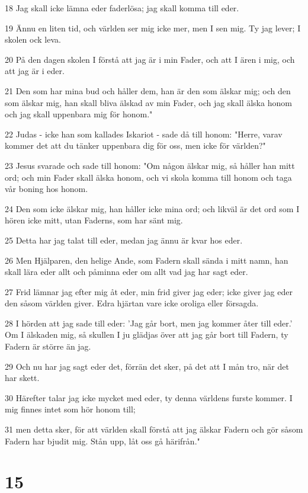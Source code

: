 \par 18 Jag skall icke lämna eder faderlösa; jag skall komma till eder.
\par 19 Ännu en liten tid, och världen ser mig icke mer, men I sen mig. Ty jag lever; I skolen ock leva.
\par 20 På den dagen skolen I förstå att jag är i min Fader, och att I ären i mig, och att jag är i eder.
\par 21 Den som har mina bud och håller dem, han är den som älskar mig; och den som älskar mig, han skall bliva älskad av min Fader, och jag skall älska honom och jag skall uppenbara mig för honom."
\par 22 Judas - icke han som kallades Iskariot - sade då till honom: "Herre, varav kommer det att du tänker uppenbara dig för oss, men icke för världen?"
\par 23 Jesus svarade och sade till honom: "Om någon älskar mig, så håller han mitt ord; och min Fader skall älska honom, och vi skola komma till honom och taga vår boning hos honom.
\par 24 Den som icke älskar mig, han håller icke mina ord; och likväl är det ord som I hören icke mitt, utan Faderns, som har sänt mig.
\par 25 Detta har jag talat till eder, medan jag ännu är kvar hos eder.
\par 26 Men Hjälparen, den helige Ande, som Fadern skall sända i mitt namn, han skall lära eder allt och påminna eder om allt vad jag har sagt eder.
\par 27 Frid lämnar jag efter mig åt eder, min frid giver jag eder; icke giver jag eder den såsom världen giver. Edra hjärtan vare icke oroliga eller försagda.
\par 28 I hörden att jag sade till eder: 'Jag går bort, men jag kommer åter till eder.' Om I älskaden mig, så skullen I ju glädjas över att jag går bort till Fadern, ty Fadern är större än jag.
\par 29 Och nu har jag sagt eder det, förrän det sker, på det att I mån tro, när det har skett.
\par 30 Härefter talar jag icke mycket med eder, ty denna världens furste kommer. I mig finnes intet som hör honom till;
\par 31 men detta sker, för att världen skall förstå att jag älskar Fadern och gör såsom Fadern har bjudit mig. Stån upp, låt oss gå härifrån."

\chapter{15}

